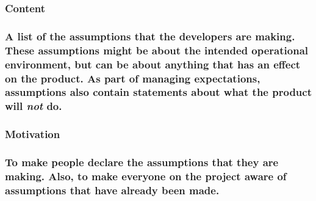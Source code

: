 \documentclass[
]{article}
\begin{document}
\hypertarget{content-21}{%
\subsubsection{Content}\label{content-21}}

\hypertarget{a-list-of-the-assumptions-that-the-developers-are-making.-these-assumptions-might-be-about-the-intended-operational-environment-but-can-be-about-anything-that-has-an-effect-on-the-product.-as-part-of-managing-expectations-assumptions-also-contain-statements-about-what-the-product-will-not-do.}{%
\subsubsection{\texorpdfstring{A list of the assumptions that the
developers are making. These assumptions might be about the intended
operational environment, but can be about anything that has an effect on
the product. As part of managing expectations, assumptions also contain
statements about what the product will \emph{\textbf{not}}
do.}{A list of the assumptions that the developers are making. These assumptions might be about the intended operational environment, but can be about anything that has an effect on the product. As part of managing expectations, assumptions also contain statements about what the product will not do.}}\label{a-list-of-the-assumptions-that-the-developers-are-making.-these-assumptions-might-be-about-the-intended-operational-environment-but-can-be-about-anything-that-has-an-effect-on-the-product.-as-part-of-managing-expectations-assumptions-also-contain-statements-about-what-the-product-will-not-do.}}

\hypertarget{motivation-21}{%
\subsubsection{Motivation}\label{motivation-21}}

\hypertarget{to-make-people-declare-the-assumptions-that-they-are-making.-also-to-make-everyone-on-the-project-aware-of-assumptions-that-have-already-been-made.}{%
\subsubsection{To make people declare the assumptions that they are
making. Also, to make everyone on the project aware of assumptions that
have already been
made.}\label{to-make-people-declare-the-assumptions-that-they-are-making.-also-to-make-everyone-on-the-project-aware-of-assumptions-that-have-already-been-made.}}
\end{document}
